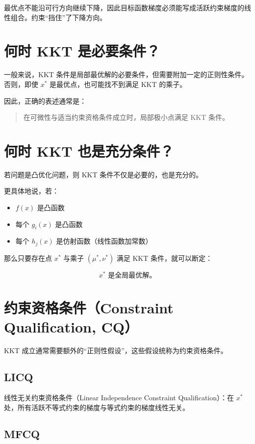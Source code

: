 最优点不能沿可行方向继续下降，因此目标函数梯度必须能写成活跃约束梯度的线性组合。约束“挡住”了下降方向。

\section{何时 KKT 是必要条件？}

一般来说，KKT 条件是局部最优解的必要条件，但需要附加一定的正则性条件。
否则，即使 \(x^*\) 是最优点，也可能找不到满足 KKT 的乘子。

因此，正确的表述通常是：

\begin{quote}
在可微性与适当约束资格条件成立时，局部极小点满足 KKT 条件。
\end{quote}

\section{何时 KKT 也是充分条件？}

若问题是凸优化问题，则 KKT 条件不仅是必要的，也是充分的。

更具体地说，若：

\begin{itemize}
  \item \(f(x)\) 是凸函数
  \item 每个 \(g_i(x)\) 是凸函数
  \item 每个 \(h_j(x)\) 是仿射函数（线性函数加常数）
\end{itemize}

那么只要存在点 \(x^*\) 与乘子 \((\mu^*,\nu^*)\) 满足 KKT 条件，就可以断定：

\[
x^* \text{ 是全局最优解。}
\]

\section{约束资格条件（Constraint Qualification, CQ）}

KKT 成立通常需要额外的“正则性假设”，这些假设统称为约束资格条件。

\subsection{LICQ}

线性无关约束资格条件（Linear Independence Constraint Qualification）：在 \(x^*\) 处，所有活跃不等式约束的梯度与等式约束的梯度线性无关。

\subsection{MFCQ}

